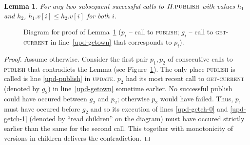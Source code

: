 \documentclass{thesis}
\newcommand{\atomic}[4]{\node(lab#1) at (#3,-#4+0.5) {#2};\draw (#3,-#4-0.1) to (lab#1);\node[inner sep=0pt](#1) at (#3,-#4) {};}
\newtheorem{lemma}{Lemma}
\newcommand{\fn}[1]{\textsc{#1}}
\begin{document}
\begin{lemma}
\label{lem-versions-increase}
For any two subsequent successful calls to $H.\fn{publish}$ with values $h_1$ and $h_2$, $h_1.v[i] \leq h_2.v[i]$ for both $i$.
\end{lemma}
\begin{figure}[!h]
\caption{Diagram for proof of Lemma~\ref{lem-versions-increase} ($p_i$ -- call to \fn{publish}; $g_i$ -- call to \fn{get-current} in line~\ref{upd-getown} that corresponds to $p_i$).}
\label{fig-versions-increase}
\end{figure}
\begin{proof}
Assume otherwise. Consider the first pair $p_1, p_2$ of consecutive calls to \fn{publish} that contradicts the Lemma (see Figure~\ref{fig-versions-increase}). The only place \fn{publish} is called is line \ref{upd-publish}
in \fn{update}.
$p_2$ had its most recent call to \fn{get-current} (denoted by $g_2$) in line~\ref{upd-getown} sometime earlier. No successful publish could have occured between $g_2$ and $p_2$; otherwise $p_2$
would have failed.
Thus, $p_1$ must have occured before $g_2$ and so its execution of lines \ref{upd-getch-0} and \ref{upd-getch-1} (denoted by ``read children'' on the diagram) must have occured strictly earlier than
the same for the second call. This together with monotonicity of versions in children delivers the contradiction.
\end{proof}
\end{document}
